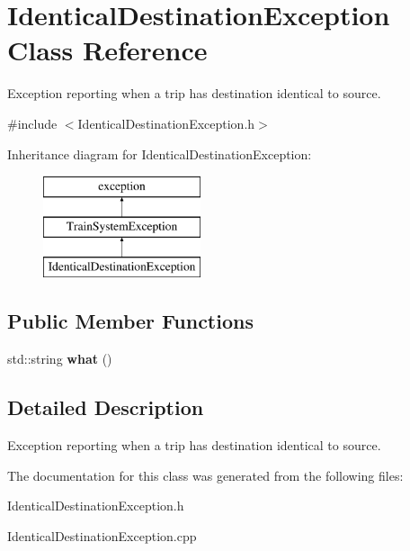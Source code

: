 \hypertarget{classIdenticalDestinationException}{}\section{Identical\+Destination\+Exception Class Reference}
\label{classIdenticalDestinationException}


Exception reporting when a trip has destination identical to source.  




{\ttfamily \#include $<$Identical\+Destination\+Exception.\+h$>$}

Inheritance diagram for Identical\+Destination\+Exception\+:\begin{figure}[H]
\begin{center}
\leavevmode
\includegraphics[height=3.000000cm]{classIdenticalDestinationException}
\end{center}
\end{figure}
\subsection*{Public Member Functions}
\begin{DoxyCompactItemize}
\item 
\mbox{\label{classIdenticalDestinationException_a5d5caea19f96fa0bb14e9ae8b6a609ad}} 
std\+::string {\bfseries what} ()
\end{DoxyCompactItemize}


\subsection{Detailed Description}
Exception reporting when a trip has destination identical to source. 

The documentation for this class was generated from the following files\+:\begin{DoxyCompactItemize}
\item 
Identical\+Destination\+Exception.\+h\item 
Identical\+Destination\+Exception.\+cpp\end{DoxyCompactItemize}
